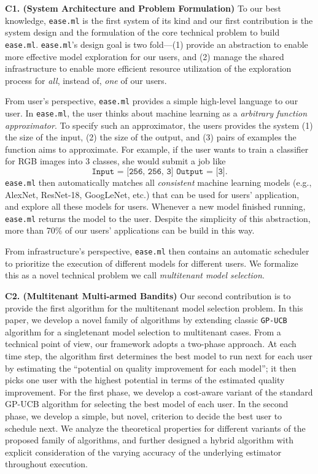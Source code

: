 \documentclass[letterpaper]{vldb}
\newcommand{\eml}{\texttt{ease.ml}\xspace}
\begin{document}
\noindent
{\bf C1. (System Architecture and Problem Formulation)}
To our best knowledge, \eml is the first system of its kind
and our first contribution is the system design and the formulation
of the core technical problem to build \eml. 
\eml's design goal is two fold---(1) provide an abstraction
to enable more effective model exploration for our users, and 
(2) manage the shared infrastructure to enable more efficient
resource utilization of the exploration process 
for {\em all}, instead of, {\em one} of our users.

From user's perspective, \eml provides a simple high-level 
language to our user. In \eml, the user thinks about 
machine learning as a {\em arbitrary function approximator}.
To specify such an approximator, the users provides the
system (1) the size of the input, (2) the size of the output,
and (3) pairs of examples the function aims to approximate.
For example, if the user wants to train a classifier
for RGB images into 3 classes, she would submit a job like
\[
\texttt{Input = [256, 256, 3]
        Output = [3]}.
\]
\eml then automatically matches all {\em consistent} machine
learning models (e.g., AlexNet, ResNet-18, GoogLeNet, etc.) 
that can be used for users' application, and
explore all these models for users. Whenever a new model
finished running, \eml returns the model to the user.
Despite the simplicity of this abstraction, more than 70\% of
our users' applications can be build in this way.

From infrastructure's perspective, \eml then contains an
automatic scheduler to prioritize the execution of
different models for different users. 
We formalize
this as a novel technical problem 
we call {\em multitenant model selection}.

\noindent
{\bf C2. (Multitenant Multi-armed Bandits)} Our second contribution
is to provide the first algorithm for the multitenant model selection
problem. In this paper, we develop a novel family of algorithms by extending 
classic \texttt{GP-UCB} algorithm for a singletenant model
selection to multitenant cases. 
From a technical point of view, our framework 
adopts a two-phase approach.
At each time step, the algorithm first determines the 
best model to run next for each user by
estimating the ``potential on quality improvement for each model'';
it then picks one user with the highest potential in terms of the estimated quality improvement.
For the first phase, we develop a cost-aware variant of the 
standard GP-UCB algorithm for selecting the best model of 
each user. In the second phase, we develop a 
simple, but novel, criterion to
decide the best user to schedule next.
We analyze the theoretical properties for different
variants of the proposed family of algorithms,
and further designed a hybrid algorithm 
with explicit consideration
of the varying accuracy of the underlying 
estimator throughout execution.
\end{document}
